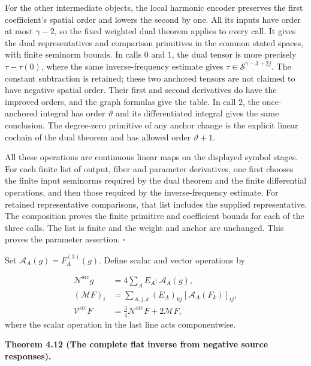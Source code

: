 \documentclass[
  english,
  11pt,
  reqno]{amsart}
\makeatletter
\newcommand{\pandocstatementheading}[1]{%
  \par\addpenalty{\@beginparpenalty}%
  \addvspace{.5\baselineskip plus .2\baselineskip minus .2\baselineskip}%
  {\normalfont\bfseries #1\par}%
  \nobreak\@afterindenttrue\@afterheading
}
\makeatother
\begin{document}
For the other intermediate objects, the local harmonic encoder preserves
the first coefficient's spatial order and lowers the second by one. All
its inputs have order at most \(\gamma-2\), so the fixed weighted dual
theorem applies to every call. It gives the dual representatives and
comparison primitives in the common stated spaces, with finite seminorm
bounds. In calls \(0\) and \(1\), the dual tensor is more precisely
\(\tau-\tau(0)\), where the same inverse-frequency estimate gives
\(\tau\in\mathscr S^{\gamma-3+2j}\). The constant subtraction is
retained; these two anchored tensors are not claimed to have negative
spatial order. Their first and second derivatives do have the improved
orders, and the graph formulas give the table. In call \(2\), the
once-anchored integral has order \(\vartheta\) and its differentiated
integral gives the same conclusion. The degree-zero primitive of any
anchor change is the explicit linear cochain of the dual theorem and has
allowed order \(\vartheta+1\).

All these operations are continuous linear maps on the displayed symbol
stages. For each finite list of output, fiber and parameter derivatives,
one first chooses the finite input seminorms required by the dual
theorem and the finite differential operations, and then those required
by the inverse-frequency estimate. For retained representative
comparisons, that list includes the supplied representative. The
composition proves the finite primitive and coefficient bounds for each
of the three calls. The list is finite and the weight and anchor are
unchanged. This proves the parameter assertion. \hfill\(\square\)

Set \(\mathcal A_A(g)=F_A^{(3)}(g)\). Define scalar and vector
operations by

\label{eq:online-negative-response-invariant-contractions}
\[
\begin{aligned}
\mathcal N^{\mathrm{src}}g
&=4\sum_AE_A:\mathcal A_A(g),\\
(\mathcal MF)_i
&=\sum_{A,j,k}(E_A)_{kj}[\mathcal A_A(F_k)]_{ij},\\
\mathcal V^{\mathrm{src}}F
&=\frac34\mathcal N^{\mathrm{src}}F+2\mathcal MF,
\end{aligned}
\] where the scalar operation in the last line acts componentwise.

\pandocstatementheading{\leavevmode{}\label{thm:online-negative-response-flat-green}Theorem 4.12 (The complete flat inverse from negative source responses).}
\end{document}
